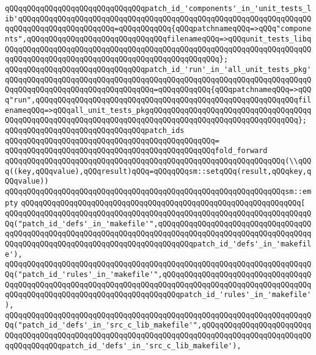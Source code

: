 \verb|qQQqqQQqqQQqqQQqqQQqqQQqqQQqqQQqpatch_id_'components'_in_'unit_tests_lib'qQQqqQQqqQQqqQQqqQQqqQQqqQQqqQQqqQQqqQQqqQQqqQQqqQQqqQQqqQQqqQQqqQQqqQQqqQQqqQQqqQQqqQQqqQQq=qQQqqQQqqQQq{qQQqpatchnameqQQq=>qQQq"components",qQQqqQQqqQQqqQQqqQQqqQQqqQQqqQQqfilenameqQQq=>qQQqunit_tests_libqQQqqQQqqQQqqQQqqQQqqQQqqQQqqQQqqQQqqQQqqQQqqQQqqQQqqQQqqQQqqQQqqQQqqQQqqQQqqQQqqQQqqQQqqQQqqQQqqQQqqQQqqQQqqQQqqQQqqQQq};|\newline
\newline
\verb|qQQqqQQqqQQqqQQqqQQqqQQqqQQqqQQqpatch_id_'run'_in_'all_unit_tests_pkg'qQQqqQQqqQQqqQQqqQQqqQQqqQQqqQQqqQQqqQQqqQQqqQQqqQQqqQQqqQQqqQQqqQQqqQQqqQQqqQQqqQQqqQQqqQQqqQQqqQQqqQQq=qQQqqQQqqQQq{qQQqpatchnameqQQq=>qQQq"run",qQQqqQQqqQQqqQQqqQQqqQQqqQQqqQQqqQQqqQQqqQQqqQQqqQQqqQQqqQQqfilenameqQQq=>qQQqall_unit_tests_pkgqQQqqQQqqQQqqQQqqQQqqQQqqQQqqQQqqQQqqQQqqQQqqQQqqQQqqQQqqQQqqQQqqQQqqQQqqQQqqQQqqQQqqQQqqQQqqQQqqQQqqQQq};|\newline
\newline
\verb|qQQqqQQqqQQqqQQqqQQqqQQqqQQqqQQqpatch_ids|\newline
\verb|qQQqqQQqqQQqqQQqqQQqqQQqqQQqqQQqqQQqqQQqqQQqqQQq=|\newline
\verb|qQQqqQQqqQQqqQQqqQQqqQQqqQQqqQQqqQQqqQQqqQQqqQQqfold_forward|\newline
\verb|qQQqqQQqqQQqqQQqqQQqqQQqqQQqqQQqqQQqqQQqqQQqqQQqqQQqqQQqqQQqqQQq(\\qQQq((key,qQQqvalue),qQQqresult)qQQq=qQQqqQQqsm::setqQQq(result,qQQqkey,qQQqvalue))|\newline
\verb|qQQqqQQqqQQqqQQqqQQqqQQqqQQqqQQqqQQqqQQqqQQqqQQqqQQqqQQqqQQqqQQqsm::empty|\newline
\verb|qQQqqQQqqQQqqQQqqQQqqQQqqQQqqQQqqQQqqQQqqQQqqQQqqQQqqQQqqQQqqQQq[|\newline
\verb|qQQqqQQqqQQqqQQqqQQqqQQqqQQqqQQqqQQqqQQqqQQqqQQqqQQqqQQqqQQqqQQqqQQqqQQq("patch_id_'defs'_in_'makefile'",qQQqqQQqqQQqqQQqqQQqqQQqqQQqqQQqqQQqqQQqqQQqqQQqqQQqqQQqqQQqqQQqqQQqqQQqqQQqqQQqqQQqqQQqqQQqqQQqqQQqqQQqqQQqqQQqqQQqqQQqqQQqqQQqqQQqqQQqqQQqqQQqqQQqpatch_id_'defs'_in_'makefile'),|\newline
\verb|qQQqqQQqqQQqqQQqqQQqqQQqqQQqqQQqqQQqqQQqqQQqqQQqqQQqqQQqqQQqqQQqqQQqqQQq("patch_id_'rules'_in_'makefile'",qQQqqQQqqQQqqQQqqQQqqQQqqQQqqQQqqQQqqQQqqQQqqQQqqQQqqQQqqQQqqQQqqQQqqQQqqQQqqQQqqQQqqQQqqQQqqQQqqQQqqQQqqQQqqQQqqQQqqQQqqQQqqQQqqQQqqQQqqQQqqQQqpatch_id_'rules'_in_'makefile'),|\newline
\verb|qQQqqQQqqQQqqQQqqQQqqQQqqQQqqQQqqQQqqQQqqQQqqQQqqQQqqQQqqQQqqQQqqQQqqQQq("patch_id_'defs'_in_'src_c_lib_makefile'",qQQqqQQqqQQqqQQqqQQqqQQqqQQqqQQqqQQqqQQqqQQqqQQqqQQqqQQqqQQqqQQqqQQqqQQqqQQqqQQqqQQqqQQqqQQqqQQqqQQqqQQqqQQqpatch_id_'defs'_in_'src_c_lib_makefile'),|\newline
